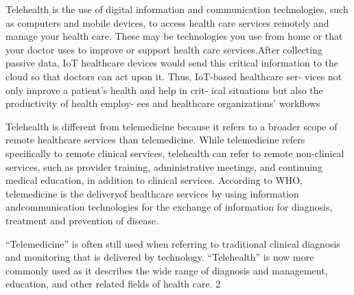 \documentclass{article}
\begin{document}
Telehealth is the use of digital information and communication technologies,
such as computers and mobile devices, to access health care services remotely
and manage your health care. These may be technologies you use from home
or that your doctor uses to improve or support health care services.After collecting passive data, IoT healthcare devices
would send this critical information to the cloud so that
doctors can act upon it. Thus, IoT-based healthcare ser-
vices not only improve a patient’s health and help in crit-
ical situations but also the productivity of health employ-
ees and healthcare organizations’ workflows




Telehealth is different from telemedicine because it refers to a broader
scope of remote healthcare services than telemedicine. While telemedicine
refers specifically to remote clinical services, telehealth can refer to remote
non-clinical services, such as provider training, administrative meetings, and
continuing medical education, in addition to clinical services. According to
WHO, telemedicine is the deliveryof healthcare services by using information
andcommunication technologies for the exchange of information for diagnosis,
treatment and prevention of disease. 


“Telemedicine” is often still used when
referring to traditional clinical diagnosis and monitoring that is delivered by
technology. “Telehealth” is now more commonly used as it describes the
wide range of diagnosis and management, education, and other related fields
of health care.
2

%
%
\end{document}
